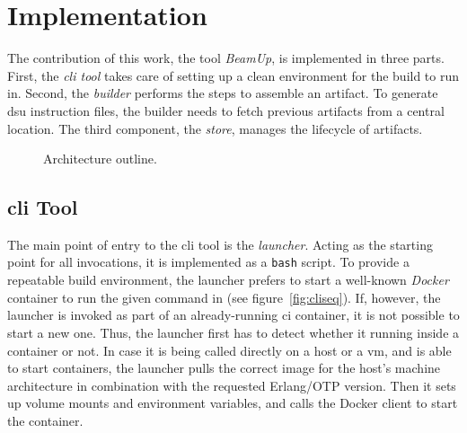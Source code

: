 \section{Implementation}

The contribution of this work, the tool \emph{BeamUp}, is implemented in three parts. First, the \emph{\acrfull{cli} tool} takes care of setting up a clean environment for the build to run in. Second, the \emph{builder} performs the  steps to assemble an artifact. To generate \acrshort{dsu} instruction files, the builder needs to fetch previous artifacts from a central location. The third component, the \emph{store}, manages the lifecycle of artifacts.

\begin{figure}[h]
  \centering
  \caption{Architecture outline.}\label{fig:impl}
\end{figure}

\subsection{\acrlong{cli} Tool}

The main point of entry to the \acrshort{cli} tool is the \emph{launcher}. Acting as the starting point for all invocations, it is implemented as a \lstinline|bash| script. To provide a repeatable build environment, the launcher prefers to start a well-known \emph{Docker} container to run the given command in (see figure~\ref{fig:cliseq}). If, however, the launcher is invoked as part of an already-running \acrshort{ci} container, it is not possible to start a new one. Thus, the launcher first has to detect whether it running inside a container or not. In case it is being called directly on a host or a \acrshort{vm}, and is able to start containers, the launcher pulls the correct image for the host's machine architecture in combination with the requested Erlang/OTP version. Then it sets up volume mounts and environment variables, and calls the Docker client to start the container.

